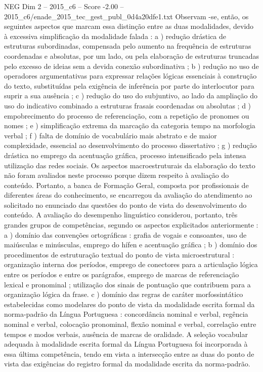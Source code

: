 \begin{textsample}{NEG Dim 2 – 2015\_c6 – Score -2.00 – 2015\_c6/enade\_2015\_tec\_gest\_publ\_0d4a20dfe1.txt}
Observam -se, então, os seguintes aspectos que marcam essa distinção entre as duas modalidades, devido à excessiva simplificação da modalidade falada : a ) redução drástica de estruturas subordinadas, compensada pelo aumento na frequência de estruturas coordenadas e absolutas, por um lado, ou pela elaboração de estruturas truncadas pelo excesso de ideias sem a devida conexão subordinativa ; b ) redução no uso de operadores argumentativas para expressar relações lógicas essenciais à construção do texto, substituídas pela exigência de inferência por parte do interlocutor para suprir a sua ausência ; c ) redução do uso do subjuntivo, ao lado da ampliação do uso do indicativo combinado a estruturas frasais coordenadas ou absolutas ; d ) empobrecimento do processo de referenciação, com a repetição de pronomes ou nomes ; e ) simplificação extrema da marcação da categoria tempo na morfologia verbal ; f ) falta de domínio de vocabulário mais abstrato e de maior complexidade, essencial ao desenvolvimento do processo dissertativo ; g ) redução drástica no emprego da acentuação gráfica, processo intensificado pela intensa utilização das redes sociais.
Os aspectos macroestruturais da elaboração do texto não foram avaliados neste processo porque dizem respeito à avaliação do conteúdo.
Portanto, a banca de Formação Geral, composta por profissionais de diferentes áreas do conhecimento, se encarregou da avaliação do atendimento ao solicitado no enunciado das questões do ponto de vista do desenvolvimento do conteúdo.
A avaliação do desempenho linguístico considerou, portanto, três grandes grupos de competências, segundo os aspectos explicitados anteriormente : a ) domínio das convenções ortográficas : grafia de vogais e consoantes, uso de maiúsculas e minúsculas, emprego do hífen e acentuação gráfica ; b ) domínio dos procedimentos de estruturação textual do ponto de vista microestrutural : organização interna dos períodos, emprego de conectores para a articulação lógica entre os períodos e entre os parágrafos, emprego de marcas de referenciação lexical e pronominal ; utilização dos sinais de pontuação que contribuem para a organização lógica da frase. c ) domínio das regras de caráter morfossintático estabelecidas como modelares do ponto de vista da modalidade escrita formal da norma-padrão da Língua Portuguesa : concordância nominal e verbal, regência nominal e verbal, colocação pronominal, flexão nominal e verbal, correlação entre tempos e modos verbais, ausência de marcas de oralidade.
A seleção vocabular adequada à modalidade escrita formal da Língua Portuguesa foi incorporada à essa última competência, tendo em vista a intersecção entre as duas do ponto de vista das exigências do registro formal da modalidade escrita da norma-padrão.

\end{textsample}
